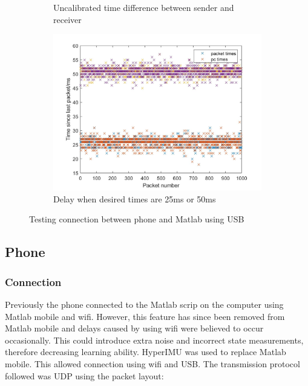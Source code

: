 \documentclass[twoside,twocolumn,12pt]{article}
\begin{document}
\begin{figure}[hb!]
\begin{subfigure}[t]{0.325\textwidth}
    \caption{Uncalibrated time difference between sender and receiver}
  \label{fig:td}
  \end{subfigure}
  \begin{subfigure}[t]{0.325\textwidth}
    \includegraphics[width=\linewidth]{both}
    \caption{Delay when desired times are 25ms or 50ms}
  \label{fig:ts2}
  \end{subfigure}
  \caption{Testing connection between phone and Matlab using USB}
  \label{fig:usb}
\end{figure}
\subsection{Phone}
\subsubsection{Connection}
Previously the phone connected to the Matlab scrip on the computer using Matlab mobile and wifi. However, this feature has since been removed from Matlab mobile and delays caused by using wifi were believed to occur occasionally. This could introduce extra noise and incorrect state measurements, therefore decreasing learning ability.
\newline
HyperIMU \cite{ianovir} was used to replace Matlab mobile. This allowed connection using wifi and USB. The transmission protocol followed was UDP using the packet layout:



\begin{align*}
[t, a_x, a_y ,a_z , \dot{\alpha}_x, \dot{\alpha}_y , \dot{\alpha}_z \#]
\end{align*}
\end{document}
